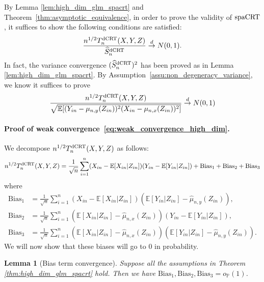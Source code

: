 \documentclass[12pt]{article}
\newtheorem{lemma}{Lemma}
\theoremstyle{definition}
\def\P{\mathbb{P}}
\def\P{\mathbb{P}}
\newcommand{\E}{\mathbb E}								%
\renewcommand{\P}{\mathbb{P}}							%
\newcommand{\srx}{X}									%
\newcommand{\srz}{Z}									%
\newcommand{\sry}{Y}									%
\newcommand{\dCRT}{\textnormal{dCRT}} 					%
\newcommand{\spacrt}{\textnormal{spaCRT}}               %
\begin{document}
By Lemma \ref{lem:high_dim_glm_spacrt} and Theorem~\ref{thm:asymptotic_equivalence}, in order to prove the validity of $\spacrt$, it suffices to show the following conditions are satisfied:
\begin{align*}
  \frac{n^{1/2}T_n^{\dCRT}(\srx,\sry,\srz)}{\widehat{S}_n^{\dCRT}}\overset{d}{\rightarrow}N(0,1).
\end{align*}
In fact, the variance convergence $(\widehat{S}_n^{\dCRT})^2$ has been proved as in Lemma \ref{lem:high_dim_glm_spacrt}. By Assumption~\ref{assu:non_degeneracy_variance}, we know it suffices to prove 
\begin{align}\label{eq:weak_convergence_high_dim}
	\frac{n^{1/2}T_n^{\dCRT}(\srx,\sry,\srz)}{\sqrt{\E[(\sry_{in}-\mu_{n,y}(\srz_{in}))^2(\srx_{in}-\mu_{n,x}(\srz_{in}))^2]}}\overset{d}{\rightarrow}N(0,1)
\end{align}

\paragraph{Proof of weak convergence~\eqref{eq:weak_convergence_high_dim}.}

We decompose $n^{1/2}T_n^{\dCRT}(\srx,\sry,\srz)$ as follows:
\begin{align*}
  n^{1/2}T_n^{\dCRT}(\srx,\sry,\srz)=\frac{1}{\sqrt{n}}\sum_{i=1}^n (\srx_{in}-\E[\srx_{in}|\srz_{in}])(\sry_{in}-\E[\sry_{in}|\srz_{in}])+\mathrm{Bias}_{1}+\mathrm{Bias}_{2}+\mathrm{Bias}_{3}
\end{align*}
where 
\begin{align*}
  \mathrm{Bias}_1
  &
  =\frac{1}{\sqrt{n}}\sum_{i=1}^n (\srx_{in}-\E[\srx_{in}|\srz_{in}])(\E[\sry_{in}|\srz_{in}]-\widehat{\mu}_{n,y}(\srz_{in})),\\
  \mathrm{Bias}_2
  &
  =\frac{1}{\sqrt{n}}\sum_{i=1}^n (\E[\srx_{in}|\srz_{in}]-\widehat{\mu}_{n,x}(\srz_{in}))(\sry_{in}-\E[\sry_{in}|\srz_{in}]),\\
  \mathrm{Bias}_3
  &
  =\frac{1}{\sqrt{n}}\sum_{i=1}^n (\E[\srx_{in}|\srz_{in}]-\widehat{\mu}_{n,x}(\srz_{in}))(\E[\sry_{in}|\srz_{in}]-\widehat{\mu}_{n,y}(\srz_{in})).
\end{align*}
We will now show that these biases will go to $0$ in probability. 
\begin{lemma}[Bias term convergence]\label{lem:lasso_bias_convergence}
  Suppose all the assumptions in Theorem \ref{thm:high_dim_glm_spacrt} hold. Then we have $\mathrm{Bias}_1,\mathrm{Bias}_2,\mathrm{Bias}_3=o_{\P}(1)$.
\end{lemma}
\end{document}
